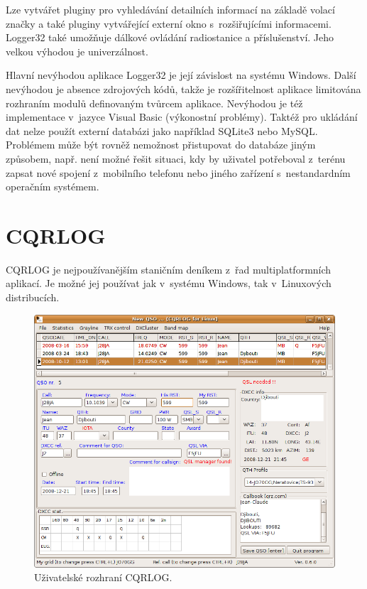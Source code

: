 Lze vytvářet pluginy pro vyhledávání detailních informací na základě volací značky a také pluginy vytvářející externí okno
s~rozšiřujícími informacemi. Logger32 také umožňuje dálkové ovládání
radiostanice a příslušenství. Jeho velkou výhodou je univerzálnost.

Hlavní nevýhodou aplikace Logger32 je její závislost na systému Windows. Další nevýhodou je absence zdrojových kódů, takže je rozšířitelnost aplikace limitována rozhraním modulů definovaným
tvůrcem aplikace. Nevýhodou je též implementace v~jazyce Visual Basic
(výkonostní problémy).
Taktéž pro ukládání dat nelze použít externí databázi jako například SQLite3
nebo MySQL. Problémem může být rovněž nemožnost přistupovat do databáze jiným
způsobem, např. není možné řešit situaci, kdy by uživatel potřeboval z~terénu 
zapsat %
nové spojení z~mobilního telefonu nebo jiného zařízení s~nestandardním operačním systémem.

\section{CQRLOG}

CQRLOG je nejpoužívanějším staničním deníkem z~řad multiplatformních aplikací. Je možné jej používat jak v~systému
Windows, tak v~Linuxových distribucích.

\begin{figure}[h]
\centering
\includegraphics[trim=0cm 0cm 0cm 0cm, scale=0.5]{fig/cqrlog}
\caption{Uživatelské rozhraní CQRLOG.}
\label{fig:cqrlog}
\end{figure}

